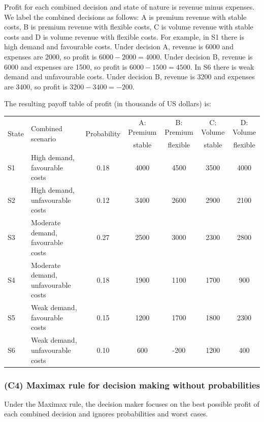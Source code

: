 Profit for each combined decision and state of nature is revenue minus expenses. We label the combined decisions as
follows: A is premium revenue with stable costs, B is premium revenue with flexible costs, C is volume revenue with stable
costs and D is volume revenue with flexible costs. For example, in S1 there is high demand and favourable costs. Under
decision A, revenue is 6000 and expenses are 2000, so profit is \(6000 - 2000 = 4000\). Under decision B, revenue is 6000
and expenses are 1500, so profit is \(6000 - 1500 = 4500\). In S6 there is weak demand and unfavourable costs. Under
decision B, revenue is 3200 and expenses are 3400, so profit is \(3200 - 3400 = -200\).

\medskip
The resulting payoff table of profit (in thousands of US dollars) is:
\begin{table}[h!]
	\centering
	\footnotesize
	\setlength{\tabcolsep}{4pt}
	\begin{tabularx}{\linewidth}{@{}l p{5cm} c *{4}{c} @{}}
		\toprule
		\multirow{2}{*}{State}
		& \multirow{2}{3cm}{Combined scenario}
		& \multirow{2}{*}{Probability}
		& A: Premium & B: Premium & C: Volume & D: Volume \\
		& & & stable & flexible & stable & flexible \\
		\midrule
		S1 & High demand, favourable costs       & 0.18 & 4000 & 4500 & 3500 & 4000 \\
		S2 & High demand, unfavourable costs     & 0.12 & 3400 & 2600 & 2900 & 2100 \\
		S3 & Moderate demand, favourable costs   & 0.27 & 2500 & 3000 & 2300 & 2800 \\
		S4 & Moderate demand, unfavourable costs & 0.18 & 1900 & 1100 & 1700 &  900 \\
		S5 & Weak demand, favourable costs       & 0.15 & 1200 & 1700 & 1800 & 2300 \\
		S6 & Weak demand, unfavourable costs     & 0.10 &  600 & -200 & 1200 &  400 \\
		\bottomrule
	\end{tabularx}
\end{table}




\subsubsection{(C4) Maximax rule for decision making without probabilities}\label{subsubsec:example3-c4}

Under the Maximax rule, the decision maker focuses on the best possible profit of each combined decision and ignores
probabilities and worst cases.

